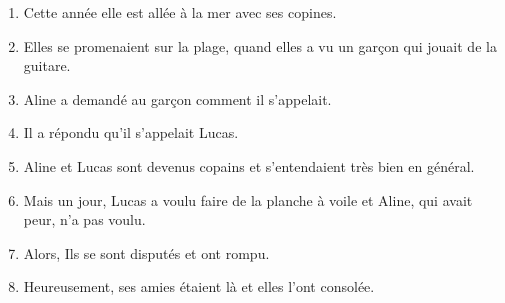 \documentclass[letterpaper]{article}
\begin{document}
\doublespacing
\begin{enumerate}
\item
Cette année elle est allée à la mer avec ses copines.
\item
Elles se promenaient sur la plage, quand elles a vu un garçon qui jouait de la guitare.
\item
Aline a demandé au garçon comment il s'appelait.
\item
Il a répondu qu'il s'appelait Lucas.
\item
Aline et Lucas sont devenus copains et s'entendaient très bien en général.
\item
Mais un jour, Lucas a voulu faire de la planche à voile et Aline, qui avait peur, n'a pas voulu.
\item
Alors, Ils se sont disputés et ont rompu.
\item
Heureusement, ses amies étaient là et elles l'ont consolée.
\end{enumerate}
\end{document}
